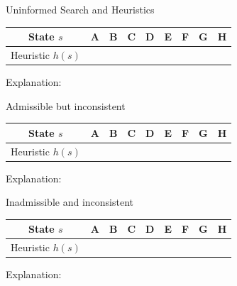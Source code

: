 \begin{problem}{Uninformed Search and Heuristics}
\begin{question}
\begin{subquestion}[3]
\def\arraystretch{1.5}
\setlength\tabcolsep{15pt}
\begin{center}
\begin{tabular}{|c|c|c|c|c|c|c|c|c|}
    \hline
      State $s$ & A & B & C & D & E & F & G & H  \\
    \hline
      Heuristic $h(s)$ &  &  &  &  &  &  &  &  \\
    \hline
\end{tabular}
\end{center}

Explanation: 

\end{subquestion}

\begin{subquestion}[4]
Admissible but inconsistent

\def\arraystretch{1.5}
\setlength\tabcolsep{15pt}
\begin{center}
\begin{tabular}{|c|c|c|c|c|c|c|c|c|}
    \hline
      State $s$ & A & B & C & D & E & F & G & H  \\
    \hline
       Heuristic $h(s)$ &  &  &  &  &  &  &  &  \\
    \hline
\end{tabular}
\end{center}

Explanation: 

\end{subquestion}

\begin{subquestion}[3]
Inadmissible and inconsistent

\def\arraystretch{1.5}
\setlength\tabcolsep{15pt}
\begin{center}
\begin{tabular}{|c|c|c|c|c|c|c|c|c|}
    \hline
      State $s$ & A & B & C & D & E & F & G & H  \\
    \hline
      Heuristic $h(s)$ &  &  &  &  &  &  &  &  \\
    \hline
\end{tabular}
\end{center}

Explanation: 

\end{subquestion}


\end{question}

\newpage
\begin{question}

\vspace{0.1in}



\end{question}
\end{problem}

